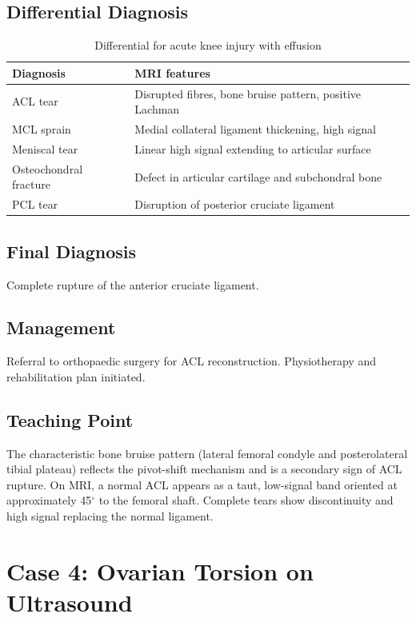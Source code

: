 \subsection{Differential Diagnosis}
\begin{table}[h]
\centering
\caption{Differential for acute knee injury with effusion}
\begin{tabular}{|p{}|p{}|}
\hline
\textbf{Diagnosis} & \textbf{MRI features} \\
\hline
ACL tear & Disrupted fibres, bone bruise pattern, positive Lachman \\
\hline
MCL sprain & Medial collateral ligament thickening, high signal \\
\hline
Meniscal tear & Linear high signal extending to articular surface \\
\hline
Osteochondral fracture & Defect in articular cartilage and subchondral bone \\
\hline
PCL tear & Disruption of posterior cruciate ligament \\
\hline
\end{tabular}
\end{table}

\subsection{Final Diagnosis}
Complete rupture of the anterior cruciate ligament.

\subsection{Management}
Referral to orthopaedic surgery for ACL reconstruction. Physiotherapy and rehabilitation plan initiated.

\subsection{Teaching Point}
The characteristic bone bruise pattern (lateral femoral condyle and posterolateral tibial plateau) reflects the pivot-shift mechanism and is a secondary sign of ACL rupture. On MRI, a normal ACL appears as a taut, low-signal band oriented at approximately 45$^\circ$ to the femoral shaft. Complete tears show discontinuity and high signal replacing the normal ligament.

\clearpage

\section{Case 4: Ovarian Torsion on Ultrasound}

